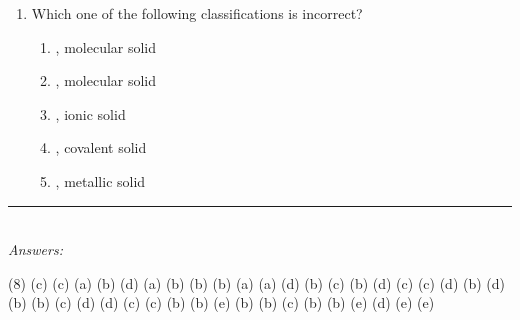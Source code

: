 \documentclass[main.tex]{subfiles}
\begin{document}
\begin{fullwidth}
\begin{multicols}{2}
\begin{enumerate}[resume]
		






\item Which one of the following classifications is incorrect?
\begin{enumerate}[label=(\alph*)]
\item  {}, molecular solid
\item  {}, molecular solid
\item  {}, ionic solid
\item  {}, covalent solid
\item  {}, metallic solid
 \end{enumerate} 





 \end{enumerate}
\end{multicols}
\end{fullwidth}
\begin{fullwidth}
\par\noindent\rule{0.5\textwidth}{0.4pt}\\
\emph{Answers:}\\
\vspace{-0.5cm}
\begin{tasks}[counter-format={tsk[1].}, label-align=left, label-offset={0mm}, label-width={5mm}, item-indent={1mm}, label-format={\bfseries}](8)
\task (c) 
\task (c) 
\task (a) 
\task (b) 
\task (d) 
\task (a) 
\task (b) 
\task (b) 
\task (b) 
\task (a) 
\task (a) 
\task (d) 
\task (b) 
\task (c) 
\task (b) 
\task (d) 
\task (c) 
\task (c) 
\task (d) 
\task (b) 
\task (d) 
\task (b) 
\task (b) 
\task (c) 
\task (d) 
\task (d) 
\task (c) 
\task (c) 
\task (b) 
\task (b) 
\task (e) 
\task (b) 
\task (b) 
\task (c) 
\task (b) 
\task (b) 
\task (e) 
\task (d) 
\task (e) 
\task (e) 


\end{tasks}






\end{fullwidth}
\restoregeometry
\end{document}
